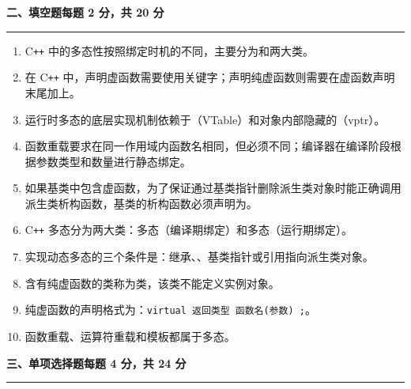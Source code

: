 \documentclass[UTF8,fontset=fandol,zihao=-4,a4paper]{ctexart}
\newcommand{\examsection}[2]{%
  \Needspace{6\baselineskip}%
  \vspace{0.15em}%
  {\heiti\zihao{4}\bfseries #1\hfill #2}\par
  \vspace{0.2em}\hrule\vspace{0.5em}}
\newcommand{\blank}[1][2.4cm]{\underline{\hspace{#1}}}
\begin{document}
\examsection{二、填空题}{每题 2 分，共 20 分}

\begin{enumerate}
  \item C\texttt{++} 中的多态性按照绑定时机的不同，主要分为\blank 和\blank 两大类。

  \item 在 C\texttt{++} 中，声明虚函数需要使用\blank 关键字；声明纯虚函数则需要在虚函数声明末尾加上\blank。

  \item 运行时多态的底层实现机制依赖于\blank（VTable）和对象内部隐藏的\blank（vptr）。

  \item 函数重载要求在同一作用域内函数名相同，但\blank 必须不同；编译器在编译阶段根据参数类型和数量进行静态绑定。

  \item 如果基类中包含虚函数，为了保证通过基类指针删除派生类对象时能正确调用派生类析构函数，基类的析构函数必须声明为\blank。

  \item C\texttt{++} 多态分为两大类：\blank 多态（编译期绑定）和\blank 多态（运行期绑定）。

  \item 实现动态多态的三个条件是：继承、\blank、基类指针或引用指向派生类对象。

  \item 含有纯虚函数的类称为\blank 类，该类不能定义实例对象。

  \item 纯虚函数的声明格式为：\texttt{virtual 返回类型 函数名(参数) }\blank\texttt{;}。

  \item 函数重载、运算符重载和模板都属于\blank 多态。
\end{enumerate}

\vspace{1em}
\examsection{三、单项选择题}{每题 4 分，共 24 分}
\end{document}
